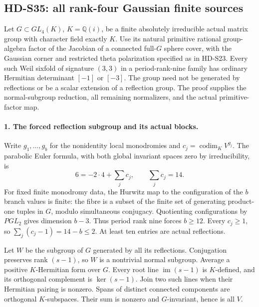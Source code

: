 \subsection{HD-S35: all rank-four Gaussian finite sources}
\label{sec:rank-four-finite-scope}

Let \(G\subset GL_4(K)\), \(K=\mathbb Q(i)\), be a finite
absolutely irreducible actual matrix group with character field exactly
\(K\). Use its natural primitive rational group-algebra factor of the
Jacobian of a connected full-\(G\) sphere cover, with the Gaussian corner
and restricted theta polarization specified as in HD-S23. Every such
Weil sixfold of signature \((3,3)\) in a period-rank-nine family has
ordinary Hermitian determinant \([-1]\) or \([-3]\).
The group need not be generated by reflections or be a scalar extension
of a reflection group. The proof supplies the normal-subgroup reduction,
all remaining normalizers, and the actual primitive-factor map.

\paragraph{1. The forced reflection subgroup and its actual blocks.}
Write \(g_1,\ldots,g_b\) for the nonidentity local monodromies and
\(c_j=\operatorname{codim}_K V^{g_j}\). The parabolic Euler formula,
with both global invariant spaces zero by irreducibility, is
\[
               6=-2\cdot4+\sum_jc_j,
               \qquad \sum_jc_j=14.                         \tag{S35.1}
\]
For fixed finite monodromy data, the Hurwitz map to the configuration
of the \(b\) branch values is finite: the fibre is a subset of the
finite set of generating product-one tuples in \(G\), modulo
simultaneous conjugacy. Quotienting configurations by \(PGL_2\)
gives dimension \(b-3\). Thus period rank nine forces \(b\ge12\).
Every \(c_j\ge1\), so
\(\sum_j(c_j-1)=14-b\le2\). At least ten entries are actual
reflections.

Let \(W\) be the subgroup of \(G\) generated by all its reflections.
Conjugation preserves rank \((s-1)\), so \(W\) is a nontrivial
normal subgroup. Average a positive \(K\)-Hermitian form over \(G\).
Every root line \(\operatorname{im}(s-1)\) is \(K\)-defined,
and its orthogonal complement is \(\ker(s-1)\). Join two such
lines when their Hermitian pairing is nonzero. Spans of distinct
connected components are orthogonal \(K\)-subspaces. Their sum is
nonzero and \(G\)-invariant, hence is all \(V\).

